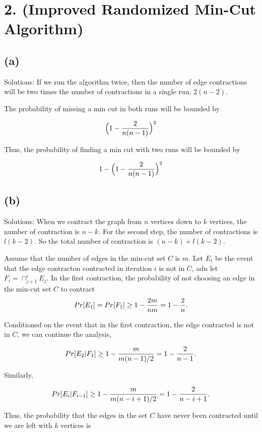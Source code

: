 \documentclass[10pt]{537homework}
\author{Peilun Dai}
\begin{document}
\section*{2. (Improved Randomized Min-Cut Algorithm) }


\subsection*{(a)} Solutions: If we run the algorithm twice, then the number of edge contractions will be two times the number of contractions in a single run, $2(n-2)$. 

The probability of missing a min cut in both runs will be bounded by 

\[
  \Big( 1 - {2 \over n(n-1)}  \Big)^2
\]

Thus, the probability of finding a min cut with two runs will be bounded by

\[ 
1 - \Big( 1 - {2 \over n(n-1)}  \Big)^2
\]


\subsection*{(b)} Solutions: When we contract the graph from $n$ vertices down to $k$ vertices, the number of contraction is $n-k$. For the second step, the number of contractions is $l(k-2)$. So the total number of contraction is $(n-k) + l(k-2)$. 

Assume that the number of edges in the min-cut set $C$ is $m$. Let $E_i$ be the event that the edge contracton contracted in iteration $i$ is not in $C$, adn let $F_i = \cap_{j+1}^i E_j$. In the first contraction, the probability of not choosing an edge in the min-cut set $C$ to contract 
$$
Pr[E_1] = Pr[F_1] \geq 1 - {2m \over nm} = 1 - {2\over n}.
$$

Conditioned on the event that in the first contraction, the edge contracted is not in $C$, we can continue the analysis,

$$
Pr[E_2|F_1] \geq 1 - {m \over m(n-1)/2} = 1 - {2 \over n-1}. 
$$

Similarly,

$$
Pr[E_i|F_{i-1}] \geq 1 - {m \over m(n-i+1)/2} = 1 - {2\over n-i+1}.
$$

Thus, the probability that the edges in the set $C$ have never been contracted until we are left with $k$ vertices is 
\end{document}
